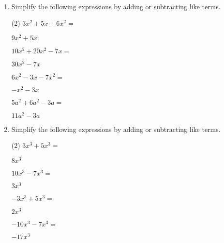 \begin{enumerate} [leftmargin=0cm]
\item Simplify the following expressions by adding or subtracting like terms.
\begin{tasks}[label=(\alph*), after-item-skip=2pt,after-skip=3pt, label-width=4ex](2)
    \task  $ 3x^2+5x+6x^2=           $                               \begin{envFillIn} $  9x^2 +5x        $ \end{envFillIn}
    \task  $ 10x^2+20x^2-7x=         $                               \begin{envFillIn} $  30x^2-7x        $ \end{envFillIn}
    \task  $ 6x^2-3x-7x^2=           $                               \begin{envFillIn} $  -x^2-3x         $ \end{envFillIn}
    \task  $ 5a^2+6a^2-3a=           $                               \begin{envFillIn} $  11a^2-3a        $ \end{envFillIn} 
\end{tasks}


\item Simplify the following expressions by adding or subtracting like terms.
\begin{tasks}[label=(\alph*), after-item-skip=2pt,after-skip=3pt, label-width=4ex](2)
    \task  $ 3x^3+5x^3=           $                               \begin{envFillIn} $  8x^3         $ \end{envFillIn}
    \task  $ 10x^3-7x^3=          $                               \begin{envFillIn} $  3x^3         $ \end{envFillIn}
    \task  $ -3x^3+5x^3=          $                               \begin{envFillIn} $  2x^3         $ \end{envFillIn}
    \task  $ -10x^3-7x^3=         $                               \begin{envFillIn} $  -17x^3       $ \end{envFillIn} 
\end{tasks}


\end{enumerate}
